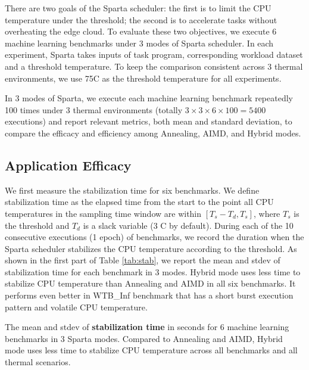 There are two goals of the Sparta scheduler: the first is to limit the CPU temperature under the threshold; the second is to accelerate tasks without overheating the edge cloud. To evaluate these two objectives, we execute 6 machine learning benchmarks under 3 modes of Sparta scheduler. In each experiment, Sparta takes inputs of task program, corresponding workload dataset and a threshold temperature. To keep the comparison consistent across 3 thermal environments, we use 75\degree C as the threshold temperature for all experiments.

In 3 modes of Sparta, we execute each machine learning benchmark repeatedly 100 times under 3 thermal environments (totally $3 \times 3 \times 6 \times 100 = 5400$ executions) and report relevant metrics, both mean and standard deviation, to compare the efficacy and efficiency among Annealing, AIMD, and Hybrid modes.


\subsection{Application Efficacy}

We first measure the stabilization time for six benchmarks. We define stabilization time as the elapsed time from the start to the point all CPU temperatures in the sampling time window are within $[T_s - T_d, T_s]$, where $T_s$ is the threshold and $T_d$ is a slack variable (3 \degree C by default). During each of the 10 consecutive executions (1 epoch) of benchmarks, we record the duration when the Sparta scheduler stabilizes the CPU temperature according to the threshold. As shown in the first part of Table \ref{tab:stab}, we report the mean and stdev of stabilization time for each benchmark in 3 modes. Hybrid mode uses less time to stabilize CPU temperature than Annealing and AIMD in all six benchmarks. It performs even better in WTB\_Inf benchmark that has a short burst execution pattern and volatile CPU temperature.


\begin{table}[t]
\caption{The mean and stdev of \textbf{stabilization time} in seconds for 6 machine learning benchmarks in 3 Sparta modes. Compared to Annealing and AIMD, Hybrid mode uses less time to stabilize CPU temperature across all benchmarks and all thermal scenarios. }\label{tab:stab}
\vspace{1mm}
\centering
\resizebox{350pt}{!}{}
\newline
\vspace{3mm}
\newline
\resizebox{300pt}{!}{}
\end{table}


